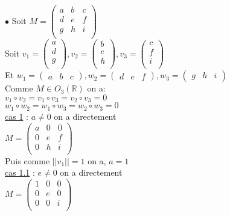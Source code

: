 \documentclass{article}
\begin{document}
\noindent $\bullet$ Soit  $M = \begin{pmatrix}
    a & b & c\\
    d & e & f\\
    g & h & i\\
\end{pmatrix}$\\
Soit $v_1 = \begin{pmatrix}
    a\\
    d\\
    g\\
\end{pmatrix}, v_2 = \begin{pmatrix}
    b\\
    e\\
    h\\
\end{pmatrix}, v_3 = \begin{pmatrix}
    c\\
    f\\
    i\\
\end{pmatrix}$\\
Et $w_1 = \begin{pmatrix}
    a & b & c
\end{pmatrix}, w_2 = \begin{pmatrix}
    d & e & f
\end{pmatrix}, w_3 = \begin{pmatrix}
    g & h & i
\end{pmatrix}$\\
Comme $M \in O_3(\mathbb{R})$ on a:\\
$v_1 \circ v_2 = v_1 \circ v_3 = v_2 \circ v_3 = 0$\\ 
$w_1 \circ w_2 = w_1 \circ w_3 = w_2 \circ w_3 = 0$\\
\underline{cas 1} : $a \neq 0$ on a directement\\
$M = \begin{pmatrix}
    a & 0 & 0\\
    0 & e & f\\
    0 & h & i\\
\end{pmatrix}$\\
Puis comme $||v_1|| = 1$ on a, $a = 1$\\
\underline{cas 1.1} : $e \neq 0$ on a directement\\
$M = \begin{pmatrix}
    1 & 0 & 0\\
    0 & e & 0\\
    0 & 0 & i\\
\end{pmatrix}$\\
\end{document}
